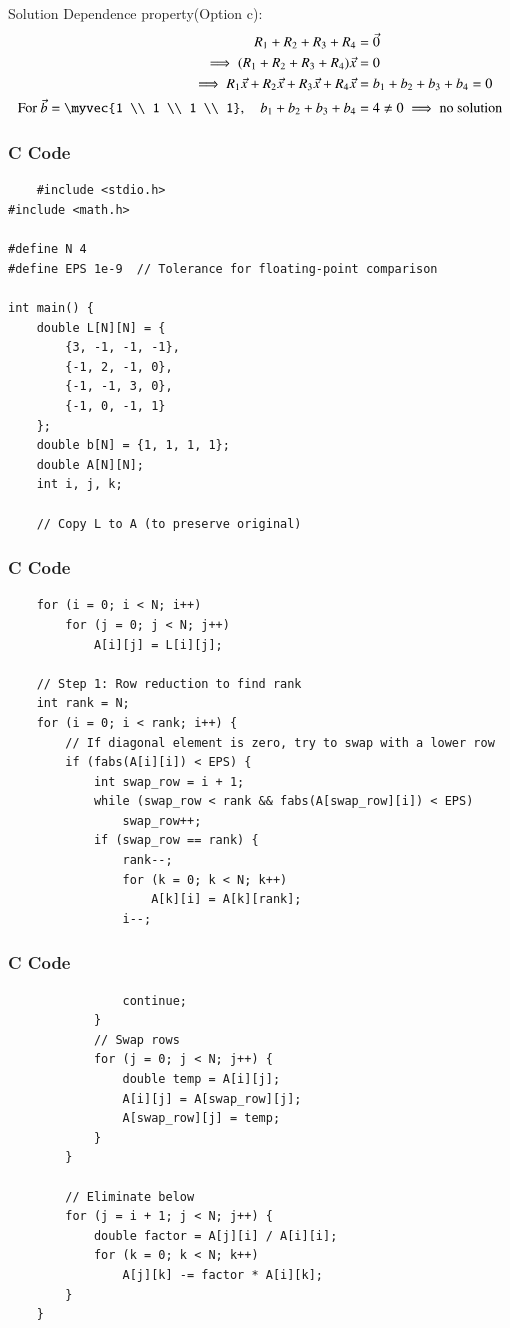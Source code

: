 \documentclass{beamer}
\begin{document}
\begin{frame}{Solution}
Dependence property(Option c):
 \begin{align}
R_1 + R_2 + R_3 + R_4 &= \vec{0} \\
\implies (R_1 + R_2 + R_3 + R_4)\vec{x} &= 0 \\
\implies R_1\vec{x} + R_2\vec{x} + R_3\vec{x} + R_4\vec{x} &= b_1 + b_2 + b_3 + b_4 = 0 \\
\text{For } \vec{b} = \myvec{1 \\ 1 \\ 1 \\ 1}, \quad b_1+b_2+b_3+b_4 &= 4 \neq 0 \implies \text{no solution}
\end{align}
\end{frame}
\begin{frame}[fragile]
\frametitle{C Code}
\begin{lstlisting}
    #include <stdio.h>
#include <math.h>

#define N 4
#define EPS 1e-9  // Tolerance for floating-point comparison

int main() {
    double L[N][N] = {
        {3, -1, -1, -1},
        {-1, 2, -1, 0},
        {-1, -1, 3, 0},
        {-1, 0, -1, 1}
    };
    double b[N] = {1, 1, 1, 1};
    double A[N][N];
    int i, j, k;

    // Copy L to A (to preserve original)
    \end{lstlisting}
    \end{frame}
\begin{frame}[fragile]
\frametitle{C Code}
\begin{lstlisting}
    for (i = 0; i < N; i++)
        for (j = 0; j < N; j++)
            A[i][j] = L[i][j];

    // Step 1: Row reduction to find rank
    int rank = N;
    for (i = 0; i < rank; i++) {
        // If diagonal element is zero, try to swap with a lower row
        if (fabs(A[i][i]) < EPS) {
            int swap_row = i + 1;
            while (swap_row < rank && fabs(A[swap_row][i]) < EPS)
                swap_row++;
            if (swap_row == rank) {
                rank--;
                for (k = 0; k < N; k++)
                    A[k][i] = A[k][rank];
                i--;
                \end{lstlisting}
    \end{frame}
\begin{frame}[fragile]
\frametitle{C Code}
\begin{lstlisting}
                continue;
            }
            // Swap rows
            for (j = 0; j < N; j++) {
                double temp = A[i][j];
                A[i][j] = A[swap_row][j];
                A[swap_row][j] = temp;
            }
        }

        // Eliminate below
        for (j = i + 1; j < N; j++) {
            double factor = A[j][i] / A[i][i];
            for (k = 0; k < N; k++)
                A[j][k] -= factor * A[i][k];
        }
    }
\end{lstlisting}
    \end{frame}
\end{document}
